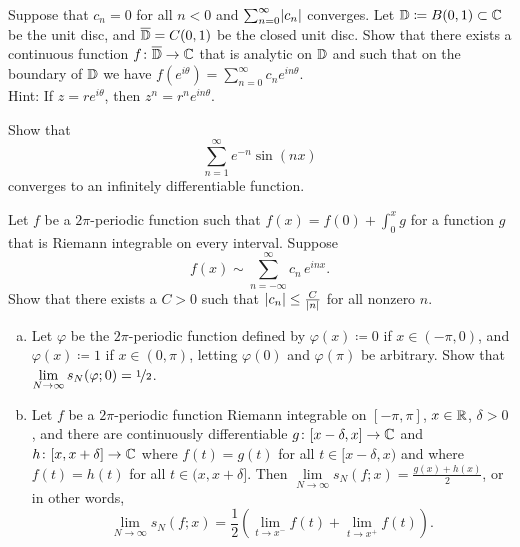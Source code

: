 \begin{exercise}
Suppose that $c_n = 0$ for all $n < 0$ and $\sum_{n=0}^\infty \lvert {c_n} \rvert$
converges.  Let ${\mathbb{D}} \coloneqq B(0,1) \subset {\mathbb{C}}$ be the unit disc,
and $\overline{{\mathbb{D}}} = C(0,1)$ be the closed unit disc.
Show that there exists a continuous function
$f \colon \overline{{\mathbb{D}}} \to {\mathbb{C}}$ that is analytic on ${\mathbb{D}}$
and such that on the boundary of ${\mathbb{D}}$ we have
$f(e^{i\theta}) = \sum_{n=0}^\infty c_n e^{in\theta}$.\\
Hint: If $z=re^{i\theta}$, then $z^n = r^n e^{in\theta}$.
\end{exercise}

\begin{exercise}
Show that
\begin{equation*}
\sum_{n=1}^\infty e^{-n} \sin(n x)
\end{equation*}
converges to an infinitely differentiable function.
\end{exercise}

\begin{exercise} \label{exercise:fsdiffmindecay}
Let $f$ be a $2\pi$-periodic function
such that $f(x) = f(0) + \int_0^x g$
for a function $g$ that is Riemann integrable on every interval.
Suppose
\begin{equation*}
f(x) \sim
\sum_{n=-\infty}^\infty c_n \,e^{inx} .
\end{equation*}
Show that there exists a $C > 0$ such that
$\lvert {c_n} \rvert \leq \frac{C}{\lvert {n} \rvert}$ for all nonzero $n$.
\end{exercise}

\begin{exercise}
\leavevmode
\begin{enumerate}[a)]
\item
Let $\varphi$ be the $2\pi$-periodic function 
defined by $\varphi(x) \coloneqq 0$ if $x \in (-\pi,0)$,
and $\varphi(x) \coloneqq 1$ if $x \in (0,\pi)$,
letting $\varphi(0)$ and $\varphi(\pi)$ be arbitrary.  Show
that $\lim\limits_{N \to \infty} s_N(\varphi;0) = \nicefrac{1}{2}$.
\item
Let $f$ be a $2\pi$-periodic function
Riemann integrable on $[-\pi,\pi]$, 
$x \in {\mathbb{R}}$, $\delta > 0$, and
there are continuously differentiable
$g \colon [x-\delta,x] \to {\mathbb{C}}$
and $h \colon [x,x+\delta] \to {\mathbb{C}}$
where $f(t) = g(t)$ for all $t \in [x-\delta,x)$
and
where $f(t) = h(t)$ for all $t \in (x,x+\delta]$.
Then
$\lim\limits_{N\to\infty} s_N(f;x) = \frac{g(x)+h(x)}{2}$, or in other words,
\begin{equation*}
\lim_{N \to \infty} s_N(f;x) =
\frac{1}{2}
\left(
\lim_{t \to x^-} f(t) +
\lim_{t \to x^+} f(t)
\right) .
\end{equation*}
\end{enumerate}
\end{exercise}

